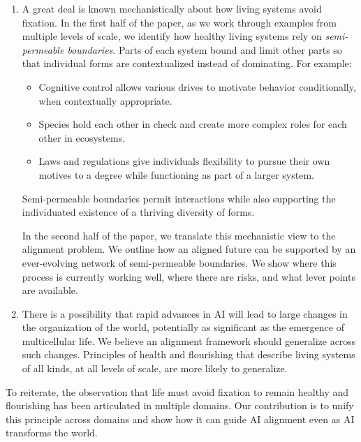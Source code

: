 \documentclass[fontsize=10.95pt]{scrartcl}
\begin{document}
\begin{enumerate}[leftmargin=2em,itemsep=0.6em]
  \item A great deal is known mechanistically about how living systems avoid fixation. In the first half of the paper, as we work through examples from multiple levels of scale, we identify how healthy living systems rely on \emph{semi-permeable boundaries}. Parts of each system bound and limit other parts so that individual forms are contextualized instead of dominating. For example:
  \begin{itemize}[leftmargin=2em,itemsep=-0.4em]
    \item Cognitive control allows various drives to motivate behavior conditionally, when contextually appropriate.
    \item Species hold each other in check and create more complex roles for each other in ecosystems.
    \item Laws and regulations give individuals flexibility to pursue their own motives to a degree while functioning as part of a larger system.
  \end{itemize}
  Semi-permeable boundaries permit interactions while also supporting the individuated existence of a thriving diversity of forms.

  In the second half of the paper, we translate this mechanistic view to the alignment problem. We outline how an aligned future can be supported by an ever-evolving network of semi-permeable boundaries. We show where this process is currently working well, where there are risks, and what lever points are available.

  \item There is a possibility that rapid advances in AI will lead to large changes in the organization of the world, potentially as significant as the emergence of multicellular life. We believe an alignment framework should generalize across such changes. Principles of health and flourishing that describe living systems of all kinds, at all levels of scale, are more likely to generalize.
\end{enumerate}

To reiterate, the observation that life must avoid fixation to remain healthy and flourishing has been articulated in multiple domains. Our contribution is to unify this principle across domains and show how it can guide AI alignment even as AI transforms the world.
\end{document}
